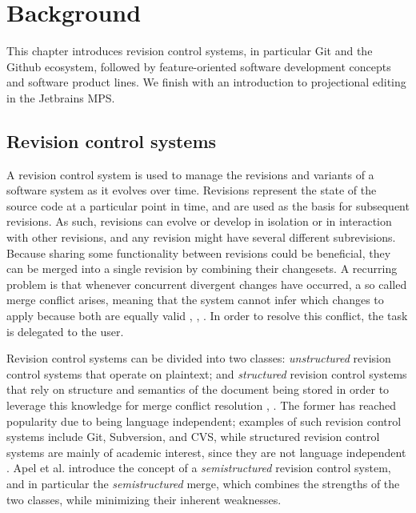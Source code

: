 \chapter{Background}

This chapter introduces revision control systems, in particular Git and the Github ecosystem, followed by feature-oriented software development concepts and software product lines. We finish with an introduction to projectional editing in the Jetbrains MPS.

\section{Revision control systems}
A revision control system is used to manage the revisions and variants of a software system as it evolves over time. Revisions represent the state of the source code at a particular point in time, and are used as the basis for subsequent revisions. As such, revisions can evolve or develop in isolation or in interaction with other revisions, and any revision might have several different subrevisions. Because sharing some functionality between revisions could be beneficial, they can be merged into a single revision by combining their changesets. A recurring problem is that whenever concurrent divergent changes have occurred, a so called merge conflict arises, meaning that the system cannot infer which changes to apply because both are equally valid \cite{mens2002}, \cite{apel2011}, \cite{buckley2005}. In order to resolve this conflict, the task is delegated to the user.

Revision control systems can be divided into two classes: \textit{unstructured} revision control systems that operate on plaintext; and \textit{structured} revision control systems that rely on structure and semantics of the document being stored in order to leverage this knowledge for merge conflict resolution \cite{mens2002}, \cite{apel2011}. The former has reached popularity due to being language independent; examples of such revision control systems include Git, Subversion, and CVS, while structured revision control systems are mainly of academic interest, since they are not language independent \cite{apel2011}. Apel et al. \cite{apel2011} introduce the concept of a \textit{semistructured} revision control system, and in particular the \textit{semistructured} merge, which combines the strengths of the two classes, while minimizing their inherent weaknesses.

